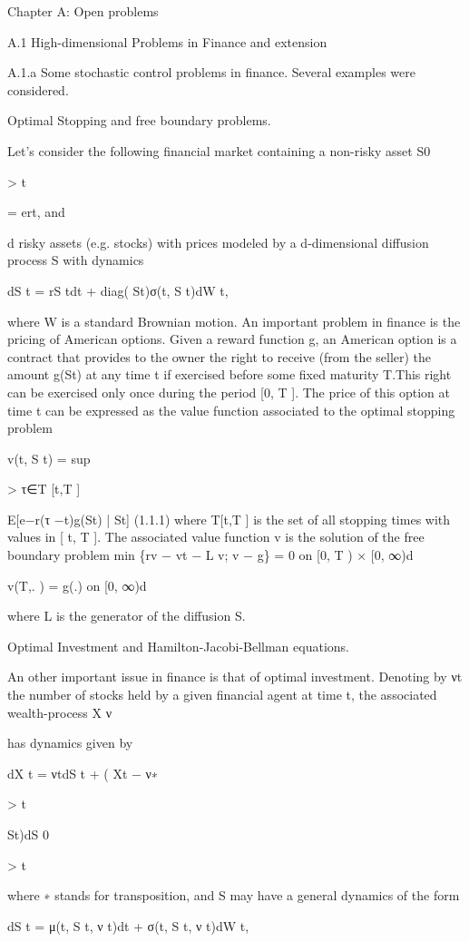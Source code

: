 \documentclass[11pt]{article}
\begin{document}
Chapter A: Open problems

A.1 High-dimensional Problems in Finance and extension

A.1.a Some stochastic control problems in finance. Several examples were considered.

Optimal Stopping and free boundary problems.

Let's consider the following financial market containing a non-risky asset S0

> t

= ert, and

d risky assets (e.g. stocks) with prices modeled by a d-dimensional diffusion process S with dynamics

dS t = rS tdt + diag( St)σ(t, S t)dW t,

where W is a standard Brownian motion. An important problem in finance is the pricing of American options. Given a reward function g, an American option is a contract that provides to the owner the right to receive (from the seller) the amount g(St) at any time t if exercised before some fixed maturity T.This right can be exercised only once during the period [0, T ]. The price of this option at time t can be expressed as the value function associated to the optimal stopping problem

v(t, S t) = sup

> τ∈T [t,T ]

E[e−r(τ −t)g(St) | St] (1.1.1) where T[t,T ] is the set of all stopping times with values in [ t, T ]. The associated value function v is the solution of the free boundary problem min \{rv − vt − L v; v − g\} = 0 on [0, T ) × [0, ∞)d

v(T,. ) = g(.) on [0, ∞)d

where L is the generator of the diffusion S.

Optimal Investment and Hamilton-Jacobi-Bellman equations.

An other important issue in finance is that of optimal investment. Denoting by νt the number of stocks held by a given financial agent at time t, the associated wealth-process X ν

has dynamics given by

dX t = νtdS t + ( Xt − ν∗

> t

St)dS 0

> t

where ∗ stands for transposition, and S may have a general dynamics of the form

dS t = μ(t, S t, ν t)dt + σ(t, S t, ν t)dW t,
\end{document}
